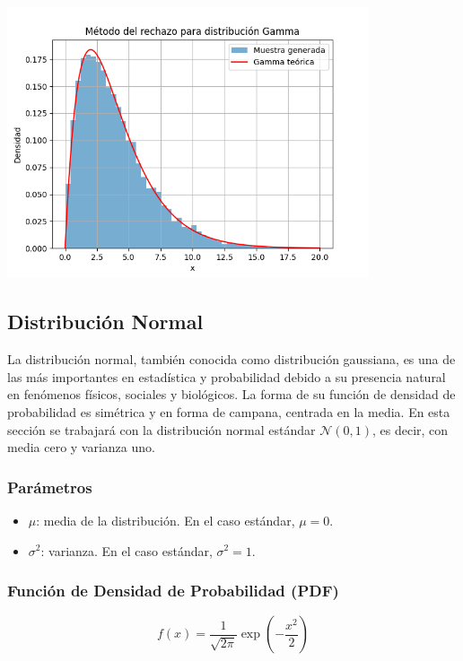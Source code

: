 \documentclass{article}
\begin{document}
\begin{center}
    \includegraphics[width=0.8\textwidth]{2.2/visualizaciones/gamma_rechazo.png}
\end{center}





\subsection{Distribución Normal}

La distribución normal, también conocida como distribución gaussiana, es una de las más importantes en estadística y probabilidad debido a su presencia natural en fenómenos físicos, sociales y biológicos. La forma de su función de densidad de probabilidad es simétrica y en forma de campana, centrada en la media. En esta sección se trabajará con la distribución normal estándar \( \mathcal{N}(0, 1) \), es decir, con media cero y varianza uno.

\subsubsection*{Parámetros}
\begin{itemize}
  \item $\mu$: media de la distribución. En el caso estándar, $\mu = 0$.
  \item $\sigma^2$: varianza. En el caso estándar, $\sigma^2 = 1$.
\end{itemize}

\subsubsection*{Función de Densidad de Probabilidad (PDF)}
\[
f(x) = \frac{1}{\sqrt{2\pi}} \exp\left(-\frac{x^2}{2}\right)
\]
\end{document}
